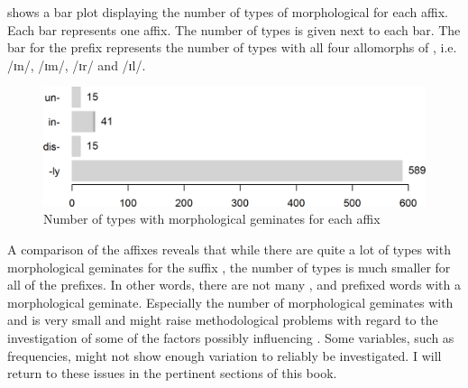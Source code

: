   shows a bar plot displaying the number of types of morphological  for each affix. Each bar represents one affix. The number of types is given next to each bar. The bar for the prefix   represents the number of types with all four allomorphs of , i.e. /ɪn/, /ɪm/, /ɪr/ and /ɪl/. 
 
\begin{figure}  
	\includegraphics[scale=0.75]{images/Theory/NumberOfMorphGemAffixes.png}
	\caption{Number of types with morphological geminates for each affix\label{fig:morphological geminates for each affix}}
\end{figure}

A comparison of the affixes reveals that while there are quite a lot of types with morphological geminates for the suffix , the number of types is much smaller for all of the prefixes. In other words, there are not many ,  and prefixed words with a {morphological geminate}. Especially the number of morphological geminates with  and  is very small and might raise methodological problems with regard to the investigation of some of the factors possibly influencing . Some variables, such as frequencies, might not show enough variation to reliably be investigated. I will return to these issues in the pertinent sections of this book.

